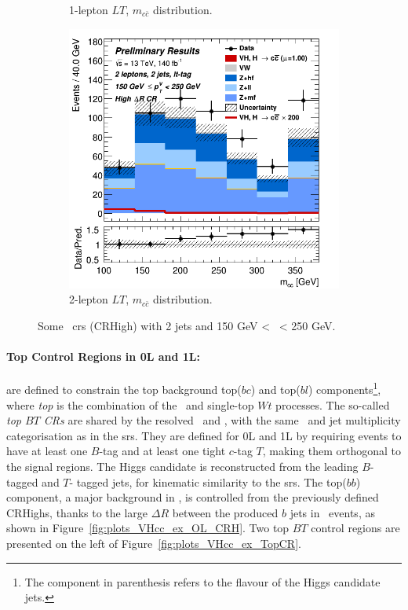 \begin{figure}[h!]
\begin{subfigure}[b]{0.32\textwidth}
      \caption{1-lepton $LT$, $m_{c\bar{c}}$ distribution.}
      \label{fig:plots_VHcc_ex_1L_CRH}
  \end{subfigure}
  \begin{subfigure}[b]{0.32\textwidth}
    \centering
    \includegraphics[width=\textwidth]{Images/VH/Own_fit/prefit_VHcc/Region_distmBB_BMax250_BMin150_DCRHigh_J2_TTypelt_T2_L2_Y6051_Prefit.png}
    \caption{2-lepton $LT$, $m_{c\bar{c}}$ distribution.}
    \label{fig:plots_VHcc_ex_2L_CRH}
\end{subfigure}
  \caption{Some \highdr\ \glspl{cr} (CRHigh) with 2 jets and 150 GeV < \ptv\ < 250 GeV.}
  \label{fig:plots_VHcc_ex_CRH}
\end{figure} 

\paragraph{Top Control Regions in 0L and 1L:} are defined to constrain the top background top($bc$) and top($bl$) components\footnote{The component in parenthesis refers to the flavour of the Higgs candidate jets.}, where \textit{top} is the combination of the \ttb\ and single-top $Wt$ processes. The so-called \textit{top $BT$ CRs} are shared by the resolved \vhb\ and \vhc, with the same \ptv\ and jet multiplicity categorisation as in the \glspl{sr}.  They are defined for 0L and 1L by requiring events to have at least one $B$-tag and at least one tight $c$-tag $T$, making them orthogonal to the signal regions. The Higgs candidate is reconstructed from the leading $B$-tagged and $T$- tagged jets, for kinematic similarity to the \glspl{sr}. The top($bb$) component, a major background in \vhb, is controlled from the previously defined CRHighs, thanks to the large $\Delta R$ between the produced $b$ jets in \ttb\ events, as shown in Figure~\ref{fig:plots_VHcc_ex_OL_CRH}. Two top $BT$ control regions are presented on the left of Figure~\ref{fig:plots_VHcc_ex_TopCR}.

